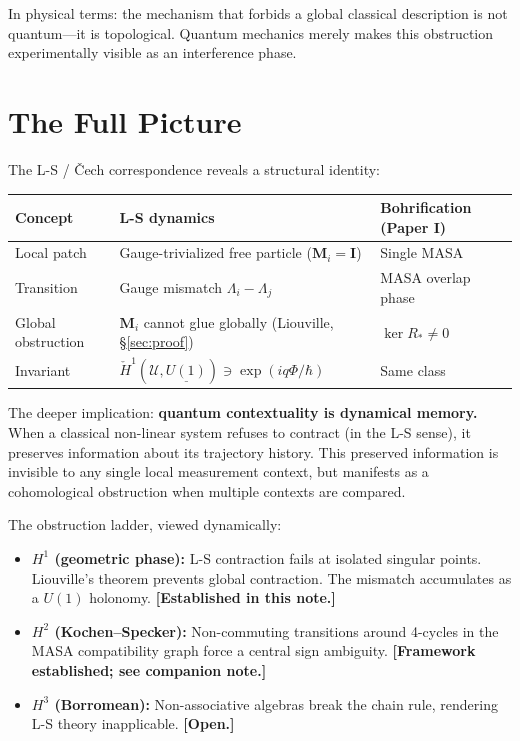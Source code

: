 \documentclass[11pt]{article}
\begin{document}
In physical terms: the mechanism that forbids a global classical description is
not quantum---it is topological. Quantum mechanics merely makes this obstruction
experimentally visible as an interference phase.

\section{The Full Picture}
\label{sec:full-picture}

The L-S / \v{C}ech correspondence reveals a structural identity:

\begin{center}
\begin{tabular}{lll}
\toprule
Concept & L-S dynamics & Bohrification (Paper I) \\
\midrule
Local patch & Gauge-trivialized free particle ($\mathbf{M}_i = \mathbf{I}$) & Single MASA \\
Transition & Gauge mismatch $\Lambda_i - \Lambda_j$ & MASA overlap phase \\
Global obstruction & $\mathbf{M}_i$ cannot glue globally (Liouville, \S\ref{sec:proof}) & $\ker R_* \neq 0$ \\
Invariant & $\check{H}^1(\mathcal{U}, \underline{U(1)}) \ni \exp(iq\Phi/\hbar)$ & Same class \\
\bottomrule
\end{tabular}
\end{center}

The deeper implication: \textbf{quantum contextuality is dynamical memory.} When
a classical non-linear system refuses to contract (in the L-S sense), it preserves
information about its trajectory history. This preserved information is invisible
to any single local measurement context, but manifests as a cohomological
obstruction when multiple contexts are compared.

The obstruction ladder, viewed dynamically:
\begin{itemize}
  \item \textbf{$H^1$ (geometric phase):} L-S contraction fails at isolated
    singular points. Liouville's theorem prevents global contraction. The mismatch
    accumulates as a $U(1)$ holonomy. \textbf{[Established in this note.]}
  \item \textbf{$H^2$ (Kochen--Specker):} Non-commuting transitions around 4-cycles
    in the MASA compatibility graph force a central sign ambiguity.
    \textbf{[Framework established; see companion note.]}
  \item \textbf{$H^3$ (Borromean):} Non-associative algebras break the chain rule,
    rendering L-S theory inapplicable. \textbf{[Open.]}
\end{itemize}
\end{document}
